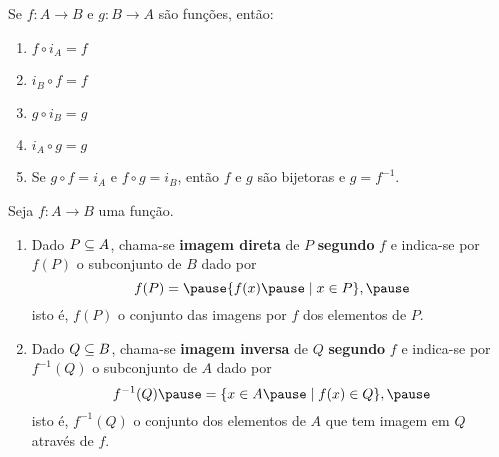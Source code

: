 \documentclass{beamer}
\begin{document}
    \begin{frame}
        \begin{proposicao}
            Se $f : A \to B$ \pause e $g : B \to A$ \pause s{\~a}o fun{\c c}{\~o}es, \pause ent{\~a}o:\pause
            \begin{enumerate}[label={\roman*})]
                \item $f\circ i_{A} = f$\pause

                \vspace{.3cm}

                \item $i_{B}\circ f = f$\pause

                \vspace{.3cm}

                \item $g\circ i_{B} = g$\pause

                \vspace{.3cm}

                \item $i_{A}\circ g = g$\pause

                \vspace{.3cm}

                \item Se $g\circ f = i_{A}$ \pause e $f\circ g = i_{B}$, \pause ent{\~a}o \pause $f$ e $g$ s{\~a}o bijetoras \pause e $g=f^{-1}$.
            \end{enumerate}
        \end{proposicao}
    \end{frame}

    \begin{frame}
        \begin{definicao}
            Seja $f : A \to B$ \pause uma fun{\c c}{\~a}o.\pause
            \begin{enumerate}[label={\roman*})]
                \item Dado $P \subseteq A$, \pause chama-se \textbf{imagem direta} \pause de $P$ \pause \textbf{segundo} $f$ \pause e indica-se por $f(P)$ \pause o subconjunto de $B$ \pause dado por\pause
                \[
                    f(P) = \pause \{f(x) \pause \mid x \in P\},\pause
                \]
                isto {\'e}, \pause $f(P)$  o conjunto das imagens por $f$ \pause dos elementos de $P$.\pause

                \vspace{.5cm}

                \item Dado $Q \subseteq B$, \pause chama-se \textbf{imagem inversa} \pause de $Q$ \textbf{segundo} $f$ \pause e indica-se por \pause $f^{-1}(Q)$ \pause o subconjunto de $A$ \pause dado por\pause
                \[
                    f^{-1}(Q) \pause = \{x \in A \pause \mid f(x) \in Q\},\pause
                \]
                isto {\'e}, \pause $f^{-1}(Q)$  o conjunto dos elementos de $A$ \pause que tem imagem em $Q$ \pause atrav{\'e}s de $f$.
            \end{enumerate}
        \end{definicao}
    \end{frame}
\end{document}

